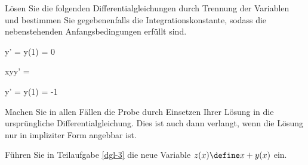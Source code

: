 \begin{atiTask}[
	topic = Gewöhnliche Differentialgleichungen,
	subtopic = Separable Differentialgleichungen,
	title = Die Methode der Variablentrennung,
	language = deutsch,
]
	Lösen Sie die folgenden Differentialgleichungen durch Trennung der Variablen und bestimmen Sie gegebenenfalls die Integrationskonstante, sodass die nebenstehenden Anfangsbedingungen erfüllt sind.
	\begin{atiSubequations}
		\item{
			\label{dgl-1}
			y' =  \separate y(1) = 0
		}
		\item{
			\label{dgl-2}
			xyy' = 
		}
		\item{
			\label{dgl-3}
			y' =  \separate y(1) = -1
		}
	\end{atiSubequations}
	Machen Sie in allen Fällen die Probe durch Einsetzen Ihrer Lösung in die ursprüngliche Differentialgleichung. Dies ist auch dann verlangt, wenn die Lösung nur in impliziter Form angebbar ist.

	\begin{atiNote}
		Führen Sie in Teilaufgabe \ref{dgl-3} die neue Variable $z(x)\define x + y(x)$ ein.
	\end{atiNote}
\end{atiTask}

